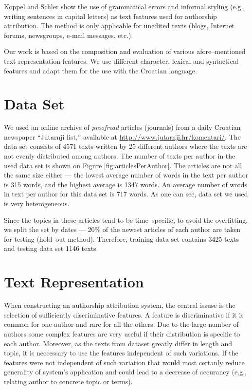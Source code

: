 \documentclass{llncs}
\begin{document}
Koppel and Schler \cite{koppel2003exploiting} show the use of grammatical
errors and informal styling (e.g., writing sentences in capital letters) as text features used for authorship attribution.
The method is only applicable for unedited texts (blogs, Internet forums,
newsgroups, e-mail messages, etc.).

Our work is based on the composition and evaluation of various
afore--mentioned text representation features. We use different
character, lexical and syntactical features and adapt them for the use with the
Croatian language.

\section{Data Set}
\label{sec:podatci}
We used an online archive of \emph{proofread} articles (journals) from a daily
Croatian newspaper ``Jutarnji list,'' available at
\url{http://www.jutarnji.hr/komentari/}. The data set consists of 4571 texts
written by 25 different authors where the texts are not evenly distributed
among authors. The number of texts per author in the used data set is shown on
Figure \ref{fig:articlesPerAuthor}. The articles are not all the same size
either --- the lowest average number of words in the text per author is 315 words, and
the highest average is 1347 words. An average number of words in text per author for
this data set is 717 words. As one can see, data set we used is very
heterogeneous.

Since the topics in these articles tend to be time--specific, to avoid the
overfitting, we split the set by dates --- 20\% of the newest articles of each author are
taken for testing (hold--out method). Therefore, training data set contains 3425 texts
and testing data set 1146 texts.

\begin{minipage}{0.8\linewidth}
\vspace{10pt}
\centerline{\resizebox{0.7\linewidth}{!}{}}%
%
\label{fig:articlesPerAuthor}
\end{minipage}

\section{Text Representation}
When constructing an authorship attribution system, the central issuse is the
selection of sufficiently discriminative features. A feature is discriminative if
it is common for one author and rare for all the others. Due to the large number
of authors some complex features are very useful if their distribution is
specific to each author. Moreover, as the texts from dataset greatly differ in
length and topic, it is neccessary to use the features independent of such
variations. If the features were not independent of such variation that
would most certanly reduce generality of system's application and could lead
to a decrease of accurancy (e.g., relating author to concrete topic or terms).
\end{document}

